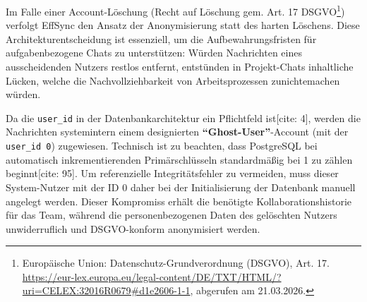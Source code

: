 Im Falle einer Account-Löschung (Recht auf Löschung gem. Art. 17 DSGVO\footnote{Europäische Union: Datenschutz-Grundverordnung (DSGVO), Art. 17. \url{https://eur-lex.europa.eu/legal-content/DE/TXT/HTML/?uri=CELEX:32016R0679\#d1e2606-1-1}, abgerufen am 21.03.2026.}) verfolgt EffSync den Ansatz der Anonymisierung statt des harten Löschens. Diese Architekturentscheidung ist essenziell, um die Aufbewahrungsfristen für aufgabenbezogene Chats zu unterstützen: Würden Nachrichten eines ausscheidenden Nutzers restlos entfernt, entstünden in Projekt-Chats inhaltliche Lücken, welche die Nachvollziehbarkeit von Arbeitsprozessen zunichtemachen würden.

Da die \texttt{user\_id} in der Datenbankarchitektur ein Pflichtfeld ist[cite: 4], werden die Nachrichten systemintern einem designierten \textbf{"`Ghost-User"'}-Account (mit der \texttt{user\_id 0}) zugewiesen. Technisch ist zu beachten, dass PostgreSQL bei automatisch inkrementierenden Primärschlüsseln standardmäßig bei 1 zu zählen beginnt[cite: 95]. Um referenzielle Integritätsfehler zu vermeiden, muss dieser System-Nutzer mit der ID 0 daher bei der Initialisierung der Datenbank manuell angelegt werden. Dieser Kompromiss erhält die benötigte Kollaborationshistorie für das Team, während die personenbezogenen Daten des gelöschten Nutzers unwiderruflich und DSGVO-konform anonymisiert werden.